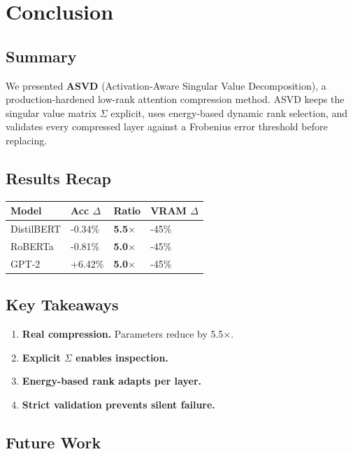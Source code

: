 
\section{Conclusion}

\subsection{Summary}

We presented \textbf{ASVD} (Activation-Aware Singular Value Decomposition), a 
production-hardened low-rank attention compression method. ASVD keeps the 
singular value matrix $\Sigma$ explicit, uses energy-based dynamic rank 
selection, and validates every compressed layer against a Frobenius error 
threshold before replacing.

\subsection{Results Recap}

\begin{table}[H]
\centering
\small
\begin{tabular}{llll}
\toprule
\textbf{Model} & \textbf{Acc $\Delta$} & \textbf{Ratio} & \textbf{VRAM $\Delta$} \\
\midrule
DistilBERT & -0.34\% & \textbf{5.5$\times$} & -45\% \\
RoBERTa & -0.81\% & \textbf{5.0$\times$} & -45\% \\
GPT-2 & +6.42\% & \textbf{5.0$\times$} & -45\% \\
\bottomrule
\end{tabular}
\end{table}

\subsection{Key Takeaways}

\begin{enumerate}
\item \textbf{Real compression.} Parameters reduce by 5.5$\times$.
\item \textbf{Explicit $\Sigma$ enables inspection.}
\item \textbf{Energy-based rank adapts per layer.}
\item \textbf{Strict validation prevents silent failure.}

\end{enumerate}
\subsection{Future Work}


